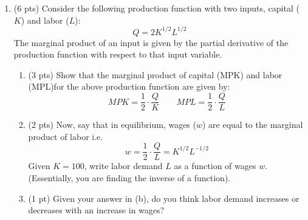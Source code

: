 \documentclass{./../../../Latex/tests}
\begin{document}
\begin{enumerate}
\newpage
\item (6 pts) Consider the following production function with two inputs, capital ($K$) and labor ($L$):
$$ Q = 2K^{1/2}L^{1/2} $$
The marginal product of an input is given by the partial derivative of the production function with respect to that input variable. 
\begin{enumerate}
\item (3 pts) Show that the marginal product of capital (MPK) and labor (MPL)for the above production function are given by:
$$ MPK = \frac{1}{2}\cdot\frac{Q}{K} \quad \quad MPL = \frac{1}{2}\cdot \frac{Q}{L} $$
\vspace{4cm}
\item (2 pts) Now, say that in equilibrium, wages ($w$) are equal to the marginal product of labor i.e.
$$ w = \frac{1}{2}\cdot \frac{Q}{L} = K^{1/2}L^{-1/2}   $$
Given $K=100$, write labor demand $L$ as a function of wages $w$. (Essentially, you are finding the inverse of a function).
\vspace{4cm}
\item (1 pt) Given your answer in (b), do you think labor demand increases or decreases with an increase in wages?
\end{enumerate}

\end{enumerate}
\end{document}
